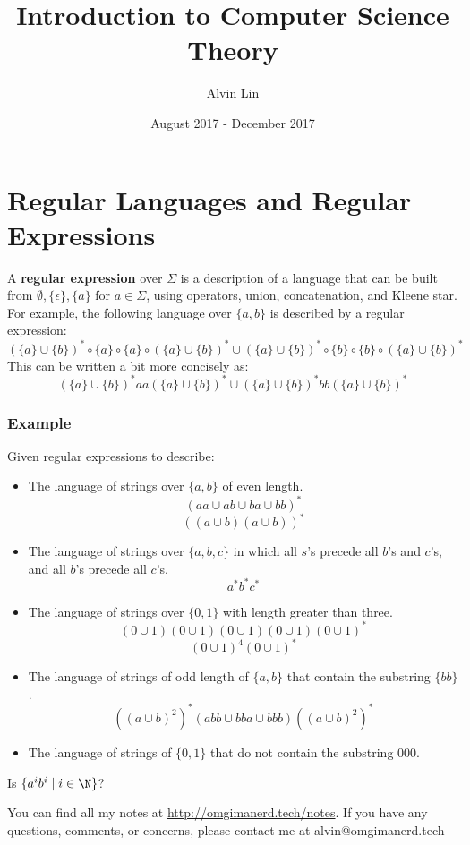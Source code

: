 \documentclass[letterpaper, 12pt]{math}
\title{Introduction to Computer Science Theory}
\author{Alvin Lin}
\date{August 2017 - December 2017}
\begin{document}
\maketitle

\section*{Regular Languages and Regular Expressions}
A \textbf{regular expression} over \( \Sigma \) is a description of a language
that can be built from \( \emptyset,\{\epsilon\},\{a\} \) for \( a\in\Sigma \),
using operators, union, concatenation, and Kleene star. For example, the
following language over \( \{a,b\} \) is described by a regular expression:
\[ (\{a\}\cup\{b\})^*\circ\{a\}\circ\{a\}\circ(\{a\}\cup\{b\})^*\cup
  (\{a\}\cup\{b\})^*\circ\{b\}\circ\{b\}\circ(\{a\}\cup\{b\})^* \]
This can be written a bit more concisely as:
\[ (\{a\}\cup\{b\})^*aa(\{a\}\cup\{b\})^*\cup
  (\{a\}\cup\{b\})^*bb(\{a\}\cup\{b\})^* \]

\subsubsection*{Example}
Given regular expressions to describe:
\begin{itemize}
  \item The language of strings over \( \{a,b\} \) of even length.
  \[ (aa\cup ab\cup ba\cup bb)^* \]
  \[ ((a\cup b)(a\cup b))^* \]
  \item The language of strings over \( \{a,b,c\} \) in which all \( s \)'s
  precede all \( b \)'s and \( c \)'s, and all \( b \)'s precede all \( c \)'s.
  \[ a^*b^*c^* \]
  \item The language of strings over \( \{0,1\} \) with length greater than
  three.
  \[ (0\cup1)(0\cup1)(0\cup1)(0\cup1)(0\cup1)^* \]
  \[ (0\cup1)^4(0\cup1)^* \]
  \item The language of strings of odd length of \( \{a,b\} \) that contain
  the substring \( \{ bb \} \).
  \[ ((a\cup b)^2)^*(abb\cup bba \cup bbb)((a\cup b)^2)^* \]
  \item The language of strings of \( \{0,1\} \) that do not contain the
  substring \( 000 \).
\end{itemize}
Is \( \{a^ib^i \mid i\in\N \} \)?

\begin{center}
  You can find all my notes at \url{http://omgimanerd.tech/notes}. If you have
  any questions, comments, or concerns, please contact me at
  alvin@omgimanerd.tech
\end{center}
\end{document}
